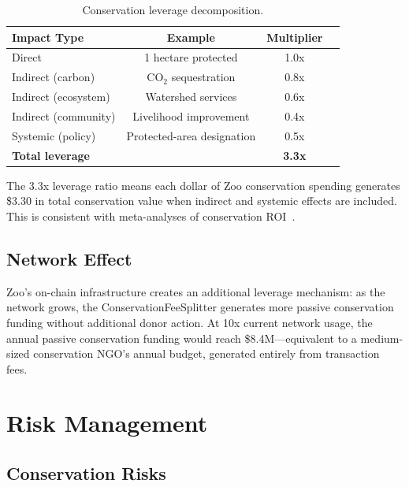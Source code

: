 \documentclass[11pt,letterpaper]{article}
\begin{document}
\begin{table}[t]
\centering
\begin{tabular}{lccc}
\toprule
\textbf{Impact Type} & \textbf{Example} & \textbf{Multiplier} \\
\midrule
Direct & 1 hectare protected & 1.0x \\
Indirect (carbon) & CO$_2$ sequestration & 0.8x \\
Indirect (ecosystem) & Watershed services & 0.6x \\
Indirect (community) & Livelihood improvement & 0.4x \\
Systemic (policy) & Protected-area designation & 0.5x \\
\midrule
\textbf{Total leverage} & & \textbf{3.3x} \\
\bottomrule
\end{tabular}
\caption{Conservation leverage decomposition.}
\label{tab:leverage}
\end{table}

The 3.3x leverage ratio means each dollar of Zoo conservation spending generates \$3.30 in total conservation value when indirect and systemic effects are included. This is consistent with meta-analyses of conservation ROI~\cite{waldron2019, balmford2003}.

\subsection{Network Effect}

Zoo's on-chain infrastructure creates an additional leverage mechanism: as the network grows, the ConservationFeeSplitter generates more passive conservation funding without additional donor action. At 10x current network usage, the annual passive conservation funding would reach \$8.4M---equivalent to a medium-sized conservation NGO's annual budget, generated entirely from transaction fees.

\section{Risk Management}

\subsection{Conservation Risks}
\end{document}
